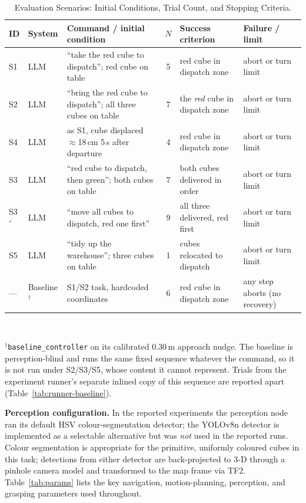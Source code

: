 \documentclass[conference]{IEEEtran}
\begin{document}
\begin{table}[t]
\caption{Evaluation Scenarios: Initial Conditions, Trial Count, and Stopping Criteria.}
\label{tab:scenarios}
\centering
\small
\begin{tabular}{@{}llp{3.4cm}cp{2.6cm}p{3.4cm}@{}}
\toprule
\textbf{ID} & \textbf{System} & \textbf{Command / initial condition} & \textbf{$N$} & \textbf{Success criterion} & \textbf{Failure / limit} \\
\midrule
S1 & LLM & ``take the red cube to dispatch''; red cube on table & 5 & red cube in dispatch zone & abort or turn limit \\
S2 & LLM & ``bring the red cube to dispatch''; all three cubes on table & 7 & the \emph{red} cube in dispatch zone & abort or turn limit \\
S4 & LLM & as S1, cube displaced $\approx$18\,cm 5\,s after departure & 4 & red cube in dispatch zone & abort or turn limit \\
S3 & LLM & ``red cube to dispatch, then green''; both cubes on table & 7 & both cubes delivered in order & abort or turn limit \\
S3$'$ & LLM & ``move all cubes to dispatch, red one first'' & 9 & all three delivered, red first & abort or turn limit \\
S5 & LLM & ``tidy up the warehouse''; three cubes on table & 1 & cubes relocated to dispatch & abort or turn limit \\
--- & Baseline$^\dagger$ & S1/S2 task, hardcoded coordinates & 6 & red cube in dispatch zone & any step aborts (no recovery) \\
\bottomrule
\end{tabular}
\\[2pt]
\raggedright\footnotesize $^\dagger$\texttt{baseline\_controller} on its
calibrated 0.30\,m approach nudge. The baseline is perception-blind and
runs the same fixed sequence whatever the command, so it is not run under
S2/S3/S5, whose content it cannot represent. Trials from the experiment
runner's separate inlined copy of this sequence are reported apart
(Table~\ref{tab:runner-baseline}).
\end{table}

\textbf{Perception configuration.} In the reported experiments the
perception node ran its default HSV colour-segmentation detector; the
YOLOv8n detector is implemented as a selectable alternative but was
\emph{not} used in the reported runs. Colour segmentation is appropriate for
the primitive, uniformly coloured cubes in this task; detections from either
detector are back-projected to 3-D through a pinhole camera model and
transformed to the map frame via TF2. Table~\ref{tab:params} lists the key
navigation, motion-planning, perception, and grasping parameters used
throughout.
\end{document}

